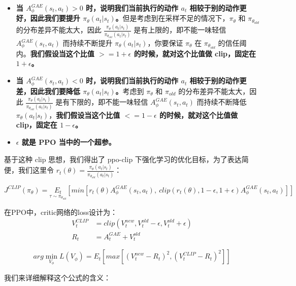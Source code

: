 \documentclass[UTF8,fontset=fandol]{ctexart}
\begin{document}
\begin{itemize}
\item \textbf{当 \(A_\phi^{GAE}(s_t, a_t) > 0\) 时，说明我们当前执行的动作 \(a_t\) 相较于别的动作更好，因此我们要提升 \(\pi_\theta(a_t|s_t)\)。}但是考虑到在采样不足的情况下，\(\pi_\theta\) 和 \(\pi_{\theta_{old}}\) 的分布差异不能太大，因此 \(\frac{\pi_\theta(a_t|s_t)}{\pi_{\theta_{old}}(a_t|s_t)}\) 是有上限的，即不能一味轻信 \(A_\phi^{GAE}(s_t, a_t)\) 而持续不断提升 \(\pi_\theta(a_t|s_t)\)，你要保证 \(\pi_\theta\) 在 \(\pi_{\theta_{old}}\) 的信任阈内。\textbf{我们假设当这个比值 \(>= 1 + \epsilon\) 的时候，就对这个比值做 clip，固定在 \(1 + \epsilon\)。}
\item \textbf{当 \(A_\phi^{GAE}(s_t, a_t) < 0\) 时，说明我们当前执行的动作 \(a_t\) 相较于别的动作更差，因此我们要降低 \(\pi_\theta(a_t|s_t)\)。}考虑到 \(\pi_\theta\) 和 \(\pi_{old}\) 的分布差异不能太大，因此 \(\frac{\pi_\theta(a_t|s_t)}{\pi_{\theta_{old}}(a_t|s_t)}\) 是有下限的，即不能一味轻信 \(A_\phi^{GAE}(s_t, a_t)\) 而持续不断降低 \(\pi_\theta(a_t|s_t)\)，\textbf{我们假设当这个比值 \(<= 1 - \epsilon\) 的时候，就对这个比值做 clip，固定在 \(1 - \epsilon\)。}
\item \textbf{\(\epsilon\) 就是 PPO 当中的一个超参。}
\end{itemize}

基于这种 clip 思想，我们得出了 ppo-clip 下强化学习的优化目标，为了表达简便，我们这里令 \(r_t(\theta) = \frac{\pi_\theta(a_t|s_t)}{\pi_{\theta_{old}}(a_t|s_t)}\)：

\[
J^{CLIP}(\pi_\theta) = \underset{\tau \sim \pi_{\theta_{old}}}{E_t} \left[ min \left[ r_t(\theta)A_\phi^{GAE}(s_t, a_t), \ clip(r_t(\theta), 1-\epsilon, 1+\epsilon)A_\phi^{GAE}(s_t, a_t) \right] \right]
\]


在PPO中，critic网络的loss设计为：
\begin{align*}
V_t^{CLIP} &= clip(V_t^{new}, V_t^{old} - \epsilon, V_t^{old} + \epsilon) \\
R_t &= A_t^{GAE} + V_t^{old}
\end{align*}

\[
arg \min_{V_\phi} L(V_\phi) = E_t \left[ max \left[ (V_t^{new} - R_t)^2, (V_t^{CLIP} - R_t)^2 \right] \right]
\]

我们来详细解释这个公式的含义：
\end{document}
